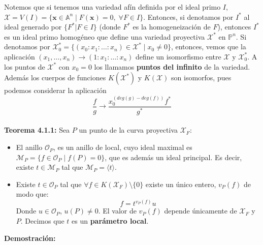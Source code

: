 \documentclass[11pt,spanish]{book}
\begin{document}
Notemos que si tenemos una variedad afín definida por el ideal primo $I$,  $\mathbf{\mathcal{X}}=V(I)=\{\mathbf{x}\in\mathbb{A}^{n}\;|\;F(\mathbf{x})=0,\;\forall F\in I\}$. Entonces, si denotamos por $I^{*}$ al ideal generado por $\{F^{*}|F\in I\}$ (donde $F^{*}$ es la homogeneización de $F$), entonces $I^{*}$ es un ideal primo homogéneo que define una variedad proyectiva $\mathbf{\mathcal{X}}^{*}$ en $\mathbb{P}^{n}$. Si denotamos por $\mathbf{\mathcal{X}}^{*}_0=\{(x_0:x_1:\ldots:x_n)\in\mathbf{\mathcal{X}}^{*}\;|\;x_0\neq 0\}$, entonces, vemos que la aplicación $(x_1,\ldots,x_n)\rightarrow (1:x_1:\ldots:x_n)$ define un isomorfismo entre $\mathbf{\mathcal{X}}$ y $\mathbf{\mathcal{X}}^{*}_0$. A los puntos de $\mathbf{\mathcal{X}}^{*}$ con $x_0=0$ los llamamos \textbf{puntos del infinito} de la variedad. Además los cuerpos de funciones $K(\mathbf{\mathcal{X}}^{*})$ y $K(\mathbf{\mathcal{X}})$ son isomorfos, pues podemos considerar la aplicación $$\frac{f}{g}\longrightarrow \frac{x_{0}^{(deg(g)-deg(f))}f^{*}}{g^{*}}$$
\\ \hypertarget{4.1.1}{\textbf{Teorema 4.1.1: }} Sea $P$ un punto de la curva proyectiva $\mathbf{\mathcal{X}}_F$:
\begin{itemize}
    
    \item El anillo $\mathcal{O}_P$, es un anillo de local, cuyo ideal maximal es $\mathcal{M}_P=\{f\in\mathcal{O}_P\;|\; f(P)= 0\}$, que es además un ideal principal. Es decir, existe $t\in\mathcal{M}_P$ tal que $\mathcal{M}_P=\langle t \rangle$.

    \item Existe $t\in\mathcal{O}_P$ tal que $\forall f\in K(\mathbf{\mathcal{X}}_F)\setminus\{0\}$ existe un único entero, $v_P(f)$ de modo que:
    $$f=t^{v_P(f)}u$$
    Donde $u\in\mathcal{O}_P$, $u(P)\neq 0$. El valor de $v_P(f)$ depende únicamente de $\mathbf{\mathcal{X}}_F$ y $P$. Decimos que $t$ es un \textbf{parámetro local}.\\

\end{itemize}
\textbf{Demostración: }
\end{document}
